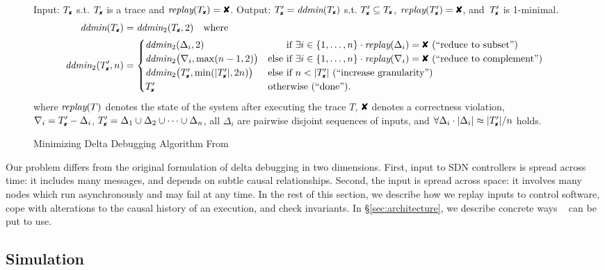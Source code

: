 \begin{figure}[t]
\caption{Minimizing Delta Debugging Algorithm From~\cite{Zeller:2002:SIF:506201.506206}}
\begin{boxedminipage}{\textwidth}
Input: $\cfail$ s.t. $\cfail$ is a trace and $\test(\cfail) = \FAIL$. Output: $\dfail
= \ddmin(\cfail)$ s.t. $\dfail \subseteq
\cfail$, $\test(\dfail) = \FAIL$, and~$\dfail$ is 1-minimal.
\begin{align*}
\ddmin(\cfail) &= \ddmin_2(\cfail, 2) \quad \text{where} \\
\ddmin_2(\dfail, n) &= 
\begin{cases}
\ddmin_2(\Delta_i, 2) & \text{\hphantom{else }if $\exists i \in \{1, \dots, n\} \cdot \test(\Delta_i) = \FAIL$ (``reduce to subset'')} \\
\ddmin_2\bigl(\nabla_i, \max(n - 1, 2)\bigr) & 
\text{else if $\exists i \in \{1, \dots, n\} \cdot \test(\nabla_i) = \FAIL$ (``reduce to complement'')} \\
\ddmin_2\bigl(\dfail, \min(|\dfail|, 2n)\bigr) & \text{else if $n < |\dfail|$ (``increase granularity'')} \\
\dfail & \text{otherwise (``done'').}
\end{cases}
\end{align*}
where $\textit{replay}(T)$ denotes the state of the system after executing the trace $T$,
$\FAIL$ denotes a correctness violation, \\
$\nabla_i = \dfail - \Delta_i$, $\dfail = \Delta_1 \cup \Delta_2 \cup \dots \cup \Delta_n$, all
$\Delta_i$ are pairwise disjoint sequences of inputs, and $\forall \Delta_i \cdot |\Delta_i| \approx |\dfail| / n$
holds.
\end{boxedminipage}
\label{fig:ddmin}
\end{figure}

Our problem differs from the original formulation of delta debugging in two dimensions.
First, input to SDN controllers is spread
across time: it includes many messages, and depends on subtle causal
relationships. Second, the input is spread across space: it involves
many nodes which run asynchronously and may fail at any time.
In the rest of this section, we describe how we
replay inputs to control software,
cope with alterations to the causal history of an execution, and check
invariants. In \S\ref{sec:architecture}, we describe concrete ways \simulator~
can be put to use.

\subsection{Simulation}
\label{subsec:replay}

